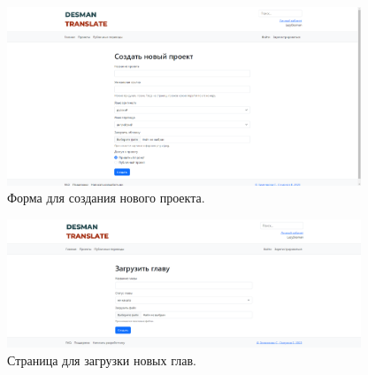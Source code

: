\documentclass[a4paper,12pt]{article}
\begin{document}
\begin{figure}[h]
\centering
\includegraphics[width=400px]{newproject.png}
\caption{Форма для создания нового проекта.}
\label{fig:newproject}
\end{figure}


\begin{figure}[h]
\centering
\includegraphics[width=400px]{addchapter.png}
\caption{Страница для загрузки новых глав.}
\label{fig:addchapter}
\end{figure}

 
\end{document}
